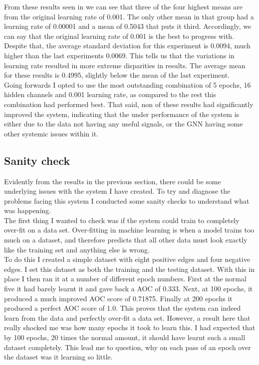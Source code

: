 \documentclass{l4proj}
\begin{document}
From these results seen in  we can see that three of the four highest means are from the original learning rate of 0.001. The only other mean in that group had a learning rate of 0.00001 and a mean of 0.5043 that puts it third. Accordingly, we can say that the original learning rate of 0.001 is the best to progress with. Despite that, the average standard deviation for this experiment is 0.0094, much higher than the last experiments 0.0069. This tells us that the variations in learning rate resulted in more extreme disparities in results. The average mean for these results is 0.4995, slightly below the mean of the last experiment. \\

Going forwards I opted to use the most outstanding combination of 5 epochs, 16 hidden channels and 0.001 learning rate, as compared to the rest this combination had performed best. That said, non of these results had significantly improved the system, indicating that the under performance of the system is either due to the data not having any useful signals, or the GNN having some other systemic issues within it. \\

\subsection{Sanity check}

Evidently from the results in the previous section, there could be some underlying issues with the system I have created. To try and diagnose the problems facing this system I conducted some sanity checks to understand what was happening. \\

The first thing I wanted to check was if the system could train to completely over-fit on a data set. Over-fitting in machine learning is when a model trains too much on a dataset, and therefore predicts that all other data must look exactly like the training set and anything else is wrong. \\

To do this I created a simple dataset with eight positive edges and four negative edges. I set this dataset as both the training and the testing dataset. With this in place I then ran it at a number of different epoch numbers. First at the normal five it had barely learnt it and gave back a AOC of 0.333. Next, at 100 epochs, it produced a much improved AOC score of 0.71875. Finally at 200 epochs it produced a perfect AOC score of 1.0. This proves that the system can indeed learn from the data and perfectly over-fit a data set. However, a result here that really shocked me was how many epochs it took to learn this. I had expected that by 100 epochs, 20 times the normal amount, it should have learnt such a small dataset completely. This lead me to question, why on each pass of an epoch over the dataset was it learning so little. \\
\end{document}
